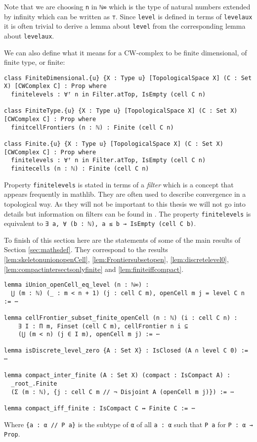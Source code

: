 Note that we are choosing \lstinline{n} in \lstinline{ℕ∞} which is the type of natural numbers extended by infinity which can be written as \lstinline{⊤}. 
Since \lstinline{level} is defined in terms of \lstinline{levelaux} it is often trivial to derive a lemma about \lstinline{level} from the corresponding lemma about \lstinline{levelaux}. 

We can also define what it means for a CW-complex to be finite dimensional, of finite type, or finite: 

\begin{lstlisting}
class FiniteDimensional.{u} {X : Type u} [TopologicalSpace X] (C : Set X) [CWComplex C] : Prop where
  finitelevels : ∀ᶠ n in Filter.atTop, IsEmpty (cell C n)

class FiniteType.{u} {X : Type u} [TopologicalSpace X] (C : Set X) [CWComplex C] : Prop where
  finitcellFrontiers (n : ℕ) : Finite (cell C n)

class Finite.{u} {X : Type u} [TopologicalSpace X] (C : Set X) [CWComplex C] : Prop where
  finitelevels : ∀ᶠ n in Filter.atTop, IsEmpty (cell C n)
  finitecells (n : ℕ) : Finite (cell C n)
\end{lstlisting}

Property \lstinline{finitelevels} is stated in terms of a \emph{filter} which is a concept that appears frequently in mathlib.
They are often used to describe convergence in a topological way. 
As they will not be important to this thesis we will not go into details but information on filters can be found in \cite{Bourbaki1966}. 
The property \lstinline{finitelevels} is equivalent to \lstinline{∃ a, ∀ (b : ℕ), a ≤ b → IsEmpty (cell C b)}. 

To finish of this section here are the statements of some of the main results of Section \ref{sec:mathsdef}.
They correspond to the results \ref{lem:skeletonunionopenCell}, \ref{lem:Frontiersubsetopen}, \ref{lem:discretelevel0}, \ref{lem:compactintersectsonlyfinite} and \ref{lem:finiteiffcompact}.

\begin{lstlisting}
lemma iUnion_openCell_eq_level (n : ℕ∞) :
  ⋃ (m : ℕ) (_ : m < n + 1) (j : cell C m), openCell m j = level C n := ⋯

lemma cellFrontier_subset_finite_openCell (n : ℕ) (i : cell C n) : 
    ∃ I : Π m, Finset (cell C m), cellFrontier n i ⊆ 
    (⋃ (m < n) (j ∈ I m), openCell m j) := ⋯

lemma isDiscrete_level_zero {A : Set X} : IsClosed (A ∩ level C 0) := ⋯

lemma compact_inter_finite (A : Set X) (compact : IsCompact A) :
  _root_.Finite 
  (Σ (m : ℕ), {j : cell C m // ¬ Disjoint A (openCell m j)}) := ⋯

lemma compact_iff_finite : IsCompact C ↔ Finite C := ⋯
\end{lstlisting}

Where \lstinline|{a : α // P a}| is the subtype of \lstinline{α} of all \lstinline{a : α} such that \lstinline{P a} for \lstinline{P : α → Prop}.